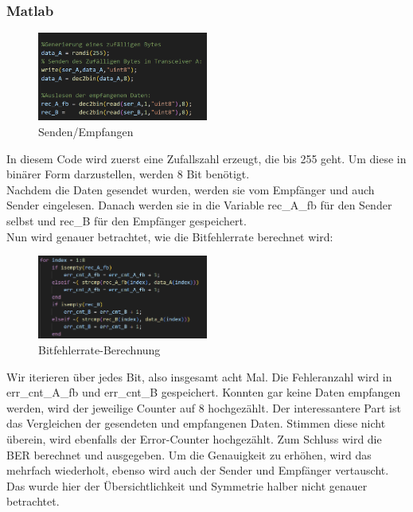 \subsubsection{Matlab}
\begin{figure}[H]
    \centering
    \includegraphics[width=0.5\textwidth]{Pictures/einlesenMatlab.png}
    \caption{Senden/Empfangen}
    \label{fig:matlab_example}
\end{figure}
In diesem Code wird zuerst eine Zufallszahl erzeugt, die bis 255 geht.
Um diese in binärer Form darzustellen, werden 8 Bit benötigt.
\\
Nachdem die Daten gesendet wurden, werden sie vom Empfänger und auch Sender eingelesen.
Danach werden sie in die Variable rec\_A\_fb für den Sender selbst und rec\_B für den Empfänger gespeichert.
\\
Nun wird genauer betrachtet, wie die Bitfehlerrate berechnet wird:
\begin{figure}[H]
    \centering
    \includegraphics[width=0.5\textwidth]{Pictures/vergleich.png}
    \caption{Bitfehlerrate-Berechnung}
    \label{fig:bitfehler}
\end{figure}
Wir iterieren über jedes Bit, also insgesamt acht Mal.
Die Fehleranzahl wird in err\_cnt\_A\_fb und err\_cnt\_B gespeichert.
Konnten gar keine Daten empfangen werden, wird der jeweilige Counter auf 8 hochgezählt.
Der interessantere Part ist das Vergleichen der gesendeten und empfangenen Daten.
Stimmen diese nicht überein, wird ebenfalls der Error-Counter hochgezählt.
Zum Schluss wird die BER berechnet und ausgegeben.
Um die Genauigkeit zu erhöhen, wird das mehrfach wiederholt, ebenso wird auch der Sender und Empfänger vertauscht.
Das wurde hier der Übersichtlichkeit und Symmetrie halber nicht genauer betrachtet.




